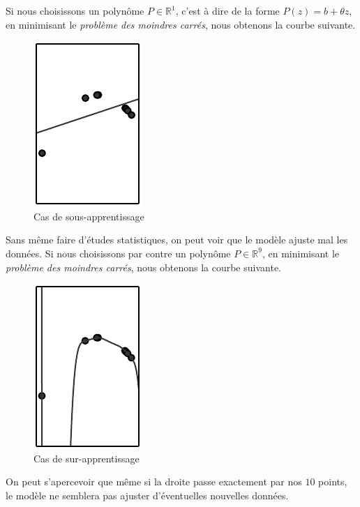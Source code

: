 \documentclass[a4paper, 11pt]{report}
\begin{document}
			
Si nous choisissons un polynôme $P \in \mathbb{R}^1$, c'est à dire de la forme $P(z) = b + \theta z$, en minimisant le \emph{problème des moindres carrés}, nous obtenons la courbe suivante.
\begin{figure}[H]
	\begin{center}
		\includegraphics[scale=0.5]{Images/Underfitting.png}
		\caption{Cas de sous-apprentissage}			
	\end{center}
\end{figure}
Sans même faire d'études statistiques, on peut voir que le modèle ajuste mal les données.
Si nous choisissons par contre un polynôme $P \in \mathbb{R}^9$, en minimisant le \emph{problème des moindres carrés}, nous obtenons la courbe suivante.
\begin{figure}[H]
	\begin{center}
		\includegraphics[scale=0.5]{Images/Overfitting.png}
		\caption{Cas de sur-apprentissage}
	\end{center}
\end{figure}
On peut s'apercevoir que même si la droite passe exactement par nos $10$ points, le modèle ne semblera pas ajuster d'éventuelles nouvelles données.
			
\end{document}
